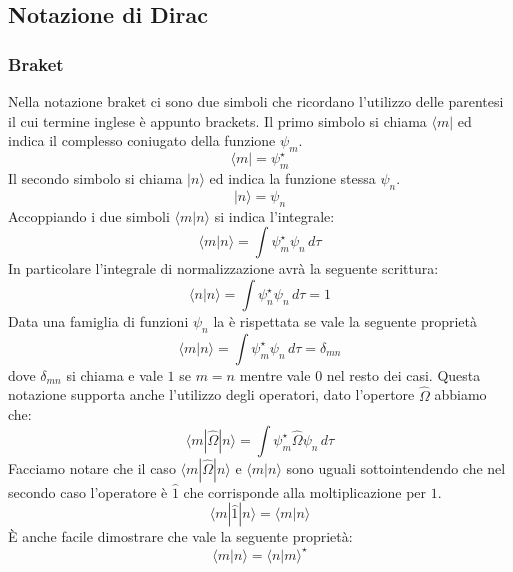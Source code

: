 \subsection{Notazione di Dirac}
\subsubsection{Braket}
Nella notazione braket ci sono due simboli che ricordano l'utilizzo delle parentesi il cui termine inglese è appunto brackets. Il primo simbolo si chiama  $\langle m |$ ed indica il complesso coniugato della funzione $\psi_m$.
$$\langle m | = \psi_m^{\star}$$
Il secondo simbolo si chiama  $| n \rangle$ ed indica la funzione stessa $\psi_n$.
$$| n \rangle = \psi_n$$
Accoppiando i due simboli $\langle m | n \rangle$ si indica l'integrale:
$$\langle m | n \rangle = \int \psi_m^{\star} \psi_n\, d\tau$$
In particolare l'integrale di normalizzazione avrà la seguente scrittura:
$$\langle n | n \rangle = \int \psi_n^{\star} \psi_n\, d\tau = 1$$
Data una famiglia di funzioni $\psi_n$ la  è rispettata se vale la seguente proprietà
$$\langle m | n \rangle = \int \psi_m^{\star} \psi_n\, d\tau = \delta_{mn}$$
dove $\delta_{mn}$ si chiama  e vale $1$ se $m = n$ mentre vale $0$ nel resto dei casi.
Questa notazione supporta anche l'utilizzo degli operatori, dato l'opertore $\hat{\Omega}$ abbiamo che:
$$\langle m | \hat{\Omega} | n \rangle = \int \psi_m^{\star} \hat{\Omega} \psi_n\, d\tau$$
Facciamo notare che il caso $\langle m | \hat{\Omega} | n \rangle$ e $\langle m | n \rangle$ sono uguali sottointendendo che nel secondo caso l'operatore è $\hat{1}$ che corrisponde alla moltiplicazione per $1$.
$$\langle m | \hat{1} | n \rangle = \langle m | n \rangle$$
È anche facile dimostrare che vale la seguente proprietà:
$$\langle m | n \rangle = {\langle n | m \rangle}^{\star}$$
